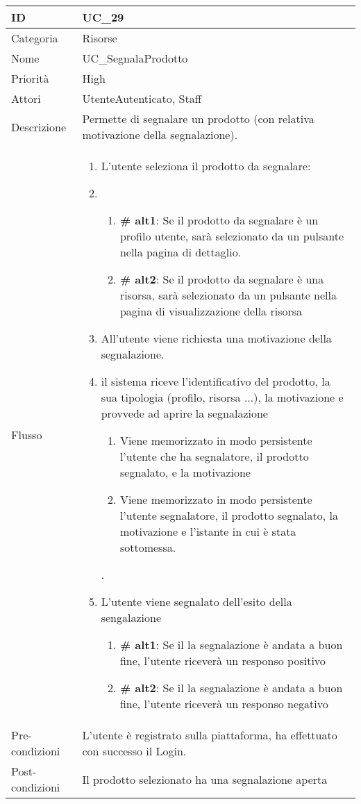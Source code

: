\begin{center}
\begin{tabular}{ |p{2cm}|p{13cm}|  }
\hline
ID & UC\_29 \\\hline
Categoria & Risorse\\\hline
Nome & UC\_SegnalaProdotto\\\hline
Priorità & High \\\hline
Attori &  UtenteAutenticato, Staff \\\hline
Descrizione & Permette di segnalare un prodotto (con relativa motivazione della segnalazione).\\\hline
Flusso &  	\begin{enumerate}
			\item L'utente seleziona il prodotto da segnalare:
			\item \begin{enumerate}[label= ]
				\item \textbf{\# alt1}: Se il prodotto da segnalare è un profilo utente, sarà selezionato da un pulsante nella pagina di dettaglio.
				\item \textbf{\# alt2}: Se il prodotto da segnalare è una risorsa, sarà selezionato da un pulsante nella pagina di visualizzazione della risorsa
				\end{enumerate}
			\item All'utente viene richiesta una motivazione della segnalazione.
			\item il sistema riceve l'identificativo del prodotto, la sua tipologia (profilo, risorsa ...), la motivazione e provvede ad aprire la segnalazione
			\begin{enumerate}[label=\arabic*. ]
				\item Viene memorizzato in modo persistente l'utente che ha segnalatore, il prodotto segnalato, e la motivazione
				\item Viene memorizzato in modo persistente l'utente segnalatore, il prodotto segnalato, la motivazione e l'istante in cui è stata sottomessa.
			\end{enumerate}.
			\item L'utente viene segnalato dell'esito della sengalazione
			\begin{enumerate}[label= ]
				\item \textbf{\# alt1}: Se il la segnalazione è andata a buon fine, l'utente riceverà un responso positivo
				\item \textbf{\# alt2}: Se il la segnalazione è andata a buon fine, l'utente riceverà un responso negativo
			\end{enumerate}
			\end{enumerate}
			\\\hline
Pre-condizioni & L'utente è registrato sulla piattaforma, ha effettuato con successo il Login.\\\hline
Post-condizioni & Il prodotto selezionato ha una segnalazione aperta\\\hline
\end{tabular}
\label{table_use_case:29}\newline


\end{center}
